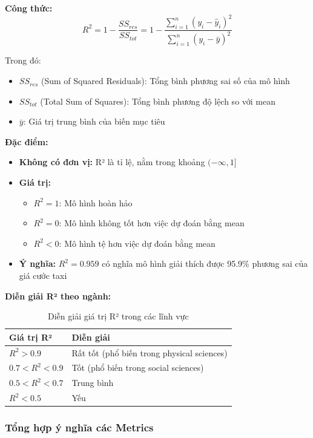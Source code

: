 \documentclass[12pt,a4paper]{article}
\begin{document}
\textbf{Công thức:}
\begin{equation}
R^2 = 1 - \frac{SS_{res}}{SS_{tot}} = 1 - \frac{\sum_{i=1}^{n}(y_i - \hat{y}_i)^2}{\sum_{i=1}^{n}(y_i - \bar{y})^2}
\end{equation}

Trong đó:
\begin{itemize}
    \item $SS_{res}$ (Sum of Squared Residuals): Tổng bình phương sai số của mô hình
    \item $SS_{tot}$ (Total Sum of Squares): Tổng bình phương độ lệch so với mean
    \item $\bar{y}$: Giá trị trung bình của biến mục tiêu
\end{itemize}

\textbf{Đặc điểm:}
\begin{itemize}
    \item \textbf{Không có đơn vị:} R² là tỉ lệ, nằm trong khoảng $(-\infty, 1]$
    \item \textbf{Giá trị:}
    \begin{itemize}
        \item $R^2 = 1$: Mô hình hoàn hảo
        \item $R^2 = 0$: Mô hình không tốt hơn việc dự đoán bằng mean
        \item $R^2 < 0$: Mô hình tệ hơn việc dự đoán bằng mean
    \end{itemize}
    \item \textbf{Ý nghĩa:} $R^2 = 0.959$ có nghĩa mô hình giải thích được 95.9\% phương sai của giá cước taxi
\end{itemize}

\textbf{Diễn giải R² theo ngành:}
\begin{table}[H]
\centering
\caption{Diễn giải giá trị R² trong các lĩnh vực}
\begin{tabular}{|l|l|}
\hline
\textbf{Giá trị R²} & \textbf{Diễn giải} \\
\hline
$R^2 > 0.9$ & Rất tốt (phổ biến trong physical sciences) \\
\hline
$0.7 < R^2 < 0.9$ & Tốt (phổ biến trong social sciences) \\
\hline
$0.5 < R^2 < 0.7$ & Trung bình \\
\hline
$R^2 < 0.5$ & Yếu \\
\hline
\end{tabular}
\end{table}

\subsubsection{Tổng hợp ý nghĩa các Metrics}
\end{document}
